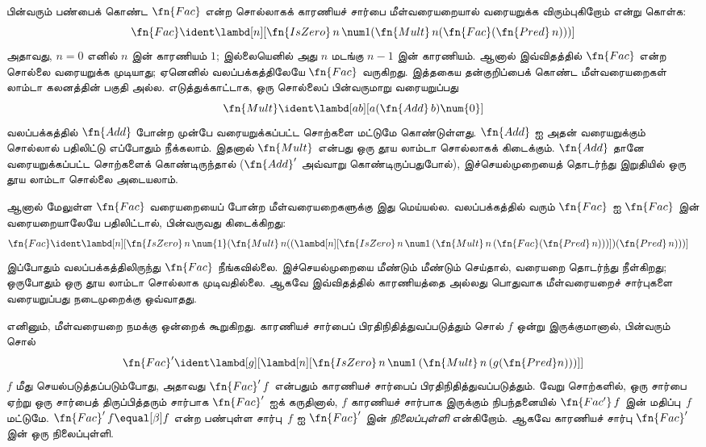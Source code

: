 \documentclass[../../../include/open-logic-section]{subfiles}
\begin{document}


பின்வரும் பண்பைக் கொண்ட $\fn{Fac}$ என்ற சொல்லாகக் காரணியச் சார்பை
மீள்வரையறையால் வரையறுக்க விரும்புகிறோம் என்று கொள்க:
\[
\fn{Fac} \ident \lambd[n][\fn{IsZero}\, n\, \num 1 (\fn{Mult}\, n (\fn{Fac}(\fn{Pred} \, n)))]
\]
அதாவது, $n = 0$ எனில் $n$ இன் காரணியம் $1$; இல்லையெனில் அது $n$ மடங்கு
$n-1$ இன் காரணியம். ஆனால் இவ்விதத்தில் $\fn{Fac}$ என்ற சொல்லை வரையறுக்க
முடியாது; ஏனெனில் வலப்பக்கத்திலேயே $\fn{Fac}$ வருகிறது. இத்தகைய
தன்குறிப்பைக் கொண்ட மீள்வரையறைகள் லாம்டா கலனத்தின் பகுதி அல்ல.
எடுத்துக்காட்டாக, ஒரு சொல்லைப் பின்வருமாறு வரையறுப்பது
\[
\fn{Mult} \ident \lambd[ab][a (\fn{Add}\, b) \num{0}]
\]
வலப்பக்கத்தில் $\fn{Add}$ போன்ற முன்பே வரையறுக்கப்பட்ட சொற்களை மட்டுமே
கொண்டுள்ளது. $\fn{Add}$ ஐ அதன் வரையறுக்கும் சொல்லால் பதிலிட்டு எப்போதும்
நீக்கலாம். இதனால் $\fn{Mult}$ என்பது ஒரு தூய லாம்டா சொல்லாகக் கிடைக்கும்.
$\fn{Add}$ தானே வரையறுக்கப்பட்ட சொற்களைக் கொண்டிருந்தால்
($\fn{Add}'$ அவ்வாறு கொண்டிருப்பதுபோல்), இச்செயல்முறையைத் தொடர்ந்து இறுதியில்
ஒரு தூய லாம்டா சொல்லை அடையலாம்.

ஆனால் மேலுள்ள $\fn{Fac}$ வரையறையைப் போன்ற மீள்வரையறைகளுக்கு இது மெய்யல்ல.
வலப்பக்கத்தில் வரும் $\fn{Fac}$ ஐ $\fn{Fac}$ இன் வரையறையாலேயே பதிலிட்டால்,
பின்வருவது கிடைக்கிறது:
\begin{align*}
  \fn{Fac} & \ident \lambd[n][\fn{IsZero}\, n\, \num{1} (\fn{Mult}\, n ((\lambd[n][\fn{IsZero} \, n \, \num 1\, (\fn{Mult}\, n\, (\fn{Fac} (\fn{Pred}\, n)))]) (\fn{Pred}\, n)))]
\end{align*}
இப்போதும் வலப்பக்கத்திலிருந்து $\fn{Fac}$ நீங்கவில்லை. இச்செயல்முறையை
மீண்டும் மீண்டும் செய்தால், வரையறை தொடர்ந்து நீள்கிறது; ஒருபோதும் ஒரு தூய
லாம்டா சொல்லாக முடிவதில்லை. ஆகவே இவ்விதத்தில் காரணியத்தை அல்லது பொதுவாக
மீள்வரையறைச் சார்புகளை வரையறுப்பது நடைமுறைக்கு ஒவ்வாதது.

எனினும், மீள்வரையறை நமக்கு ஒன்றைக் கூறுகிறது. காரணியச் சார்பைப்
பிரதிநிதித்துவப்படுத்தும் சொல் $f$ ஒன்று இருக்குமானால், பின்வரும் சொல்
\[
\fn{Fac}' \ident \lambd[g][\lambd[n][\fn{IsZero} \, n \, \num 1\, (\fn{Mult} \, n\, (g (\fn{Pred} n)))]]
\]
$f$ மீது செயல்படுத்தப்படும்போது, அதாவது $\fn{Fac}'\,f$ என்பதும் காரணியச்
சார்பைப் பிரதிநிதித்துவப்படுத்தும். வேறு சொற்களில், ஒரு சார்பை ஏற்று ஒரு
சார்பைத் திருப்பித்தரும் சார்பாக $\fn{Fac}'$ ஐக் கருதினால், $f$ காரணியச்
சார்பாக இருக்கும் நிபந்தனையில் $\fn{Fac'}\, f$ இன் மதிப்பு~$f$ மட்டுமே.
$\fn{Fac}' \, f \equal[\beta] f$ என்ற பண்புள்ள சார்பு~$f$ ஐ
$\fn{Fac}'$ இன் \emph{நிலைப்புள்ளி} என்கிறோம். ஆகவே காரணியச் சார்பு
$\fn{Fac}'$ இன் ஒரு நிலைப்புள்ளி.
\end{document}
